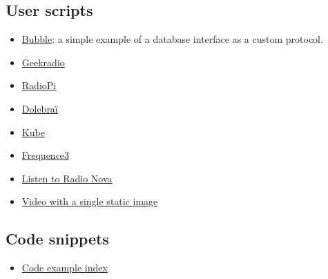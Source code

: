 \subsection{User scripts}
\begin{itemize}
\item \href{bubble.html}{Bubble}: a simple example of a database interface as a custom protocol.
\item \href{geekradio.html}{Geekradio}
\item \href{radiopi.html}{RadioPi}
\item \href{dolebrai.html}{Dolebraï}
\item \href{kube.html}{Kube}
\item \href{frequence3.html}{Frequence3}
\item \href{radio-nova.html}{Listen to Radio Nova}
\item \href{video-static.html}{Video with a single static image}

\end{itemize}
\subsection{Code snippets}
\begin{itemize}
\item \href{scripts/index.html}{Code example index}

\end{itemize}
